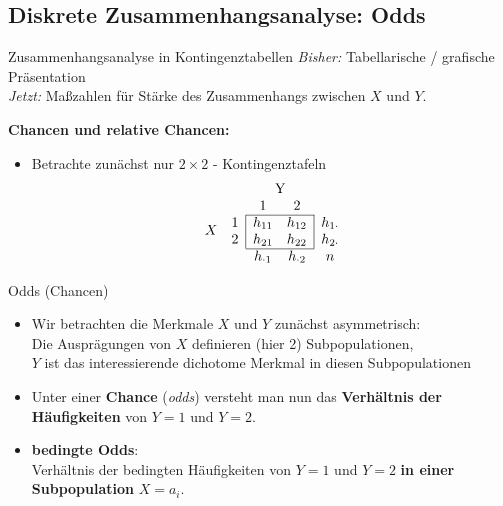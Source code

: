\documentclass[
  10pt,
  ignorenonframetext,
]{beamer}
\providecommand{\tightlist}{%
  \setlength{\itemsep}{0pt}\setlength{\parskip}{0pt}}
\begin{document}
\hypertarget{diskrete-zusammenhangsanalyse-odds}{%
\subsection{Diskrete Zusammenhangsanalyse:
Odds}\label{diskrete-zusammenhangsanalyse-odds}}

\begin{frame}{Zusammenhangsanalyse in Kontingenztabellen}
\protect\hypertarget{zusammenhangsanalyse-in-kontingenztabellen}{}
\emph{Bisher:} Tabellarische / grafische Präsentation\\
\emph{Jetzt:} Maßzahlen für Stärke des Zusammenhangs zwischen \(X\) und
\(Y\).

\textbf{Chancen und relative Chancen:}

\begin{itemize}
\tightlist
\item
  Betrachte zunächst nur \(2 \times 2\) - Kontingenztafeln
  \begin{displaymath}
   \begin{array}{cc|cc|c}
   & \multicolumn{1}{c}{}
     & \multicolumn{2}{c}{$Y$}\\
   & \multicolumn{1}{c}{}
     & 1
    & \multicolumn{1}{c}{2} \\\cline{3-4}
   & 1
     & h_{11}
    & h_{12}
      & h_{1\cdot}\\
   \raisebox{1.5ex}[-1.5ex]{$X$}
   & 2
     & h_{21}
    & h_{22}
      & h_{2\cdot}\\\cline{3-4}
   & \multicolumn{1}{c}{}
     &\multicolumn{1}{c}{h_{\cdot 1}}
    & \multicolumn{1}{c}{h_{\cdot 2} }
      & \multicolumn{1}{c}{n}
   \end{array}
   \end{displaymath}
\end{itemize}
\end{frame}

\begin{frame}{Odds (Chancen)}
\protect\hypertarget{odds-chancen}{}
\begin{itemize}
\tightlist
\item
  Wir betrachten die Merkmale \(X\) und \(Y\) zunächst asymmetrisch:\\
  Die Ausprägungen von \(X\) definieren (hier 2) Subpopulationen,\\
  \(Y\) ist das interessierende dichotome Merkmal in diesen
  Subpopulationen
\item
  Unter einer \textbf{Chance} (\emph{odds}) versteht man nun das
  \textbf{Verhältnis der Häufigkeiten} von \(Y=1\) und \(Y=2\).
\item
  \textbf{bedingte Odds}:\\
  Verhältnis der bedingten Häufigkeiten von \(Y=1\) und \(Y=2\)
  \textbf{in einer Subpopulation} \(X=a_i\).
\end{itemize}
\end{frame}
\end{document}
